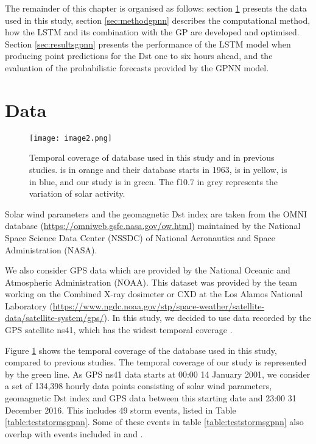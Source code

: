 The remainder of this chapter is organised as follows: section \ref{sec:datagpnn} presents the data used in this study, 
section \ref{sec:methodgpnn} describes the computational method, how the LSTM and its combination with the GP are 
developed and optimised. Section \ref{sec:resultsgpnn} presents the performance of the LSTM model when producing 
point predictions for the Dst one to six hours ahead, and the evaluation of the probabilistic forecasts provided 
by the GPNN model. 

\section{Data}\label{sec:datagpnn}

\begin{figure}
	\texttt{[image: image2.png]}
	\caption{Temporal coverage of database used in this study and in previous studies. \citet{wu1997geomagnetic} 
	is in orange and their database starts in 1963, \citet{Bala2012} is in yellow, \citet{Lazzus} is in blue, and our study is in green. 
	The f10.7 in grey represents the variation of solar activity.}
	\label{fig:datacoverage}
\end{figure}


Solar wind parameters and the geomagnetic Dst index are taken from the OMNI database 
(\url{https://omniweb.gsfc.nasa.gov/ow.html}) maintained by the National Space Science Data Center (NSSDC) 
of National Aeronautics and Space Administration (NASA).

We also consider GPS data which are provided by the National Oceanic and Atmospheric Administration (NOAA). 
This dataset was provided by the team working on the Combined X-ray dosimeter or CXD at the 
Los Alamos National Laboratory (\url{https://www.ngdc.noaa.gov/stp/space-weather/satellite-data/satellite-system/gps/}). 
In this study, we decided to use data recorded by the GPS satellite ns41, which has the widest temporal coverage 
\citep{morley2017energetic}. 

Figure \ref{fig:datacoverage} shows the temporal coverage of the database used in this study, compared to 
previous studies. The temporal coverage of our study is represented by the green line. As GPS ns41 data 
starts at 00:00 14 January 2001, we consider a set of 134,398 hourly data points consisting of 
solar wind parameters, geomagnetic Dst index and GPS data between this starting date and 23:00 31 December 2016. 
This includes 49 storm events, listed in Table \ref{table:teststormsgpnn}. Some of these events in table 
\ref{table:teststormsgpnn} also overlap with events included in \citet{Ji2012} and \citet{ChandorkarDst}. 

